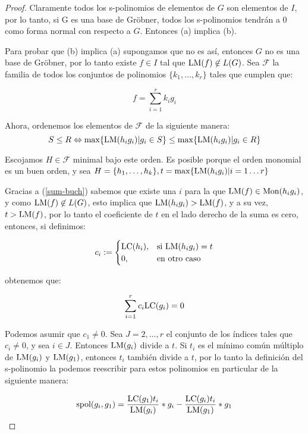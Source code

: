 \begin{proof}
Claramente todos los s-polinomios de elementos de $G$ son elementos de $I$, por lo tanto, si G es una base de Gröbner, todos los s-polinomios tendrán a 0 como forma normal con respecto a $G$. Entonces (a) implica (b).

Para probar que (b) implica (a) supongamos que no es así, entonces $G$ no es una base de Gröbner, por lo tanto existe $f \in I$ tal que $\textrm{LM}(f)\not\in L(G)$. Sea $\mathscr{F}$ la familia de todos los conjuntos de polinomios $\{k_1,\dots,k_r\}$ tales que cumplen que:

\begin{equation}\label{sum-buch}
f = \sum_{i=1}^r k_i g_i
\end{equation}

Ahora, ordenemos los elementos de $\mathscr{F}$ de la siguiente manera:
$$S \leq R \Leftrightarrow \max\{\textrm{LM}(h_ig_i)|g_i \in S\} \leq \max\{\textrm{LM}(h_ig_i)|g_i \in R\}$$

Escojamos $H \in \mathscr{F}$ minimal bajo este orden. Es posible porque el orden monomial es un buen orden, y sea $H = \{h_1, \dots, h_k\}, t = \max\{\textrm{LM}(h_ig_i)|i = 1\dots r\}$

Gracias a (\ref{sum-buch}) sabemos que existe una $i$ para la que $\textrm{LM}(f) \in \textrm{Mon}(h_ig_i)$, y como $\textrm{LM}(f) \not\in L(G)$, esto implica que $\textrm{LM}(h_ig_i) > \textrm{LM}(f)$, y a su vez, $t > \textrm{LM}(f)$, por lo tanto el coeficiente de $t$ en el lado derecho de la suma es cero, entonces, si definimos:

$$c_i:= 
	\begin{cases}
      \textrm{LC}(h_i), & \text{si}\ \textrm{LM}(h_ig_i) = t \\
      0, & \text{en otro caso}
    \end{cases}$$

obtenemos que:

\begin{equation}\label{zerosum-buch}
\sum_{i=1}^r c_i \textrm{LC}(g_i) = 0
\end{equation}

Podemos asumir que $c_1 \neq 0$. Sea $J = {2,\dots,r}$ el conjunto de los índices tales que $c_i \neq 0$, y sea $i \in J$. Entonces $\textrm{LM}(g_i)$ divide a $t$. Si $t_i$ es el mínimo común múltiplo de $\textrm{LM}(g_i)$ y $\textrm{LM}(g_1)$, entonces $t_i$ también divide a $t$, por lo tanto la definición del s-polinomio la podemos reescribir para estos polinomios en particular de la siguiente manera:

$$\textrm{spol}(g_i, g_1) = \frac{\textrm{LC}(g_1)t_i}{\textrm{LM}(g_i)}*g_i - \frac{\textrm{LC}(g_i)t_i}{\textrm{LM}(g_1)}*g_1$$


\end{proof}
